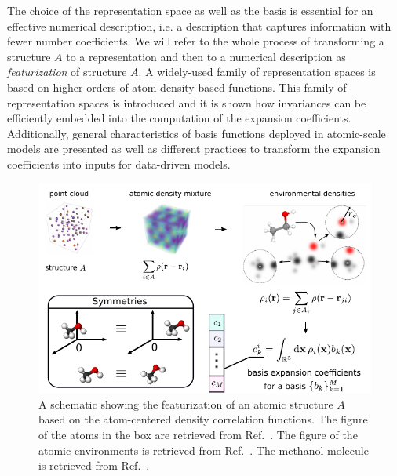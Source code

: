 The choice of the representation space as well as the basis is essential for an effective numerical description, i.e. a description that captures information with fewer number coefficients. 
We will refer to the whole process of transforming a structure $A$ to a representation and then to a numerical description as \emph{featurization} of structure $A$.
A widely-used family of representation spaces is based on higher orders of atom-density-based functions.
This family of representation spaces is introduced and it is shown how invariances can be efficiently embedded into the computation of the expansion coefficients.
Additionally, general characteristics of basis functions deployed in atomic-scale models are presented as well as different practices to transform the expansion coefficients into inputs for data-driven models.
 
\begin{figure}
  \centering
  \includegraphics[width=\textwidth]{fig/atomistic_repr_schematic.pdf}
  \caption{A schematic showing the featurization of an atomic structure $A$ based on the atom-centered density correlation functions. The figure of the atoms in the box are retrieved from Ref.~\cite{noh2019inverse}. The figure of the atomic environments is retrieved from Ref.~\cite{will+19jcp}. The methanol molecule is retrieved from Ref.~\cite{wiki:Alcohol_(chemistry)}.}
  \label{fig:acdc-scheme}
\end{figure}

